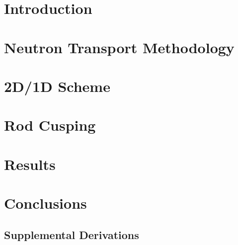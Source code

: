 \documentclass[12pt,draft]{thesis-umich}
\begin{document}


\chapter{Introduction}\label{chap:intro}


\chapter{Neutron Transport Methodology}\label{chap:transport}


\chapter{2D/1D Scheme}\label{chap:2d1d}


\chapter{Rod Cusping}\label{chap:cusping}


\chapter{Results}\label{chap:results}

 
\chapter{Conclusions}\label{chap:concl}


\renewcommand{\bibname}{References}



\begin{appendices}

\chapter{Supplemental Derivations}


\end{appendices}
\end{document}
